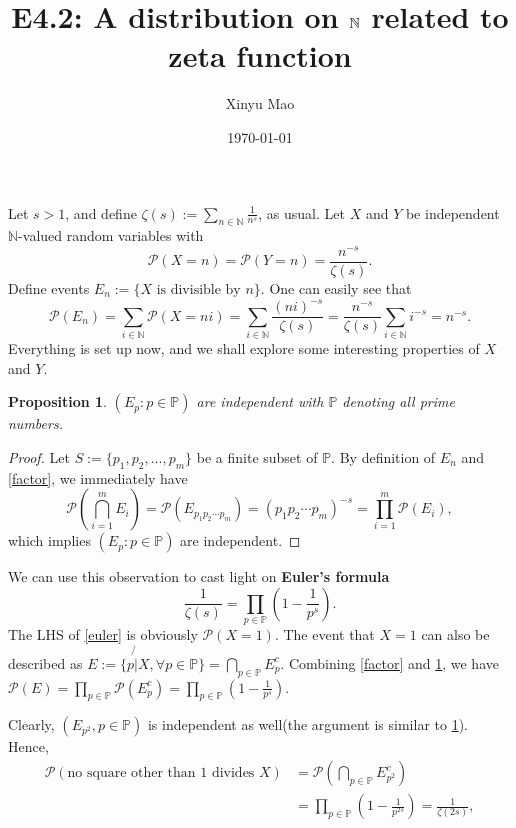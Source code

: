 \documentclass[12pt]{article}
\title{E4.2: A distribution on $\N$ related to zeta function}
\author{Xinyu Mao}
\date{\today}
\newtheorem{proposition}[theorem]{Proposition}
\newcommand\N{\mathbb{N}}
\newcommand\pp{\mathcal{P}}
\newcommand\PP{\mathbb{P}}
\newcommand\pr[1]{\mathcal{P} \left( #1\right)}
\begin{document}
\maketitle

Let $s > 1$, and define $\zeta(s) := \sum_{n \in \N} \frac{1}{n^s}$, as usual. 
Let $X$ and $Y$ be independent $\N$-valued random variables with
$$
    \pp(X = n) = \pp(Y = n) = \frac{n^{-s}}{\zeta(s)}.
$$
Define events $E_n := \{ \text{$X$ is divisible by $n$}\}$.
One can easily see that 
\begin{equation} \label{factor}
    \pp(E_n) = \sum_{i \in \N} \pp(X = ni) 
    = \sum_{i \in \N} \frac{(ni)^{-s}}{\zeta(s)}
    = \frac{n^{-s}}{\zeta(s)} \sum_{i \in \N} i^{-s}= n^{-s}.
\end{equation}
Everything is set up now, and we shall explore some interesting properties of 
$X$ and $Y$.

\begin{proposition} \label{ind}
    $(E_p : p \in \PP)$ are independent with $\PP$ denoting all prime numbers.
\end{proposition}
\begin{proof}
    Let $S := \{p_1,p_2,\dots,p_m\}$ be a finite subset of $\PP$.
    By definition of $E_n$ and \cref{factor}, we immediately have 
    $$
        \pr{\bigcap_{i = 1}^m E_i} = \pr{E_{p_1p_2\cdots p_m}}
        = (p_1p_2\cdots p_m)^{-s} = \prod_{i = 1}^m\pp(E_i),
    $$
    which implies  $(E_p : p \in \PP)$ are independent.
\end{proof}

We can use this observation to cast light on \textbf{Euler's formula}
\begin{equation} \label{euler}
    \frac{1}{\zeta(s)} = \prod_{p \in \PP} (1 - \frac{1}{p^s}).
\end{equation}
The LHS of \cref{euler} is obviously $\pp(X = 1)$. 
The event that $X = 1$ can also be described as 
$E := \{p \not{|} X, \forall p \in \PP\} = \bigcap_{p \in \PP}E_p^c$.
Combining \cref{factor} and \cref{ind}, 
we have $\pp(E) = \prod_{p\in \PP} \pp(E_p^c) = 
\prod_{p \in \PP} (1 - \frac{1}{p^s})$.

Clearly, $(E_{p^2},p \in \PP)$ is independent as well(the argument is similar to \cref{ind}).
Hence,
\begin{equation} \label{squarefree}
    \begin{aligned}
    \pp(\text{no square other than 1 divides $X$}) 
        &= \pr{\bigcap_{p \in \PP} E_{p^2}^c}  \\
        &= \prod_{p \in \PP} (1 - \frac{1}{p^{2s}}) = \frac{1}{\zeta(2s)},          
    \end{aligned}
\end{equation}
\end{document}
